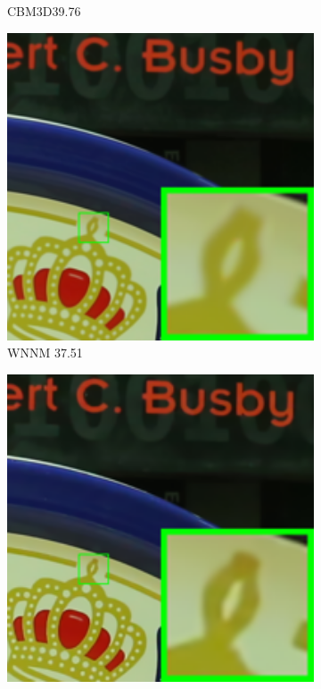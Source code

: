 \begin{figure}
\begin{subfigure}[t]{0.19\textwidth}
		\caption{CBM3D39.76}
    \end{subfigure}
    \hfill
    \begin{subfigure}[t]{0.19\textwidth}
        \centering
        \includegraphics[width=1\textwidth]{images/guided/resize_br_WNNM_5dmark3_iso3200_1_real.png}
\caption{WNNM 37.51}
    \end{subfigure}
    \hfill
    \begin{subfigure}[t]{0.19\textwidth}
        \centering
        \includegraphics[width=1\textwidth]{images/guided/resize_br_TRD_5dmark3_iso3200_1_real.png}

\end{subfigure}
\end{figure}

